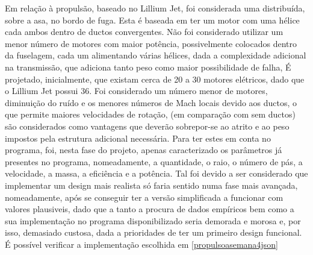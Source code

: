 Em relação à propulsão, baseado no Lillium Jet, foi considerada uma distribuída, sobre a asa, no bordo de fuga. Esta é baseada em ter um motor com uma hélice cada ambos dentro de ductos convergentes. Não foi considerado utilizar um menor número de motores com maior potência, possivelmente colocados dentro da fuselagem, cada um alimentando várias hélices, dada a complexidade adicional na transmissão, que adiciona tanto peso como maior possibilidade de falha, É projetado, inicialmente, que existam cerca de 20 a 30 motores elétricos, dado que o Lillium Jet possui 36\cite{noauthor_2021-sz}. Foi considerado um número menor de motores, diminuição do ruído e os menores números de Mach locais devido aos ductos, o que permite maiores velocidades de rotação, (em comparação com sem ductos) são considerados como vantagens que deverão sobrepor-se ao atrito e ao peso impostos pela estrutura adicional necessária. Para ter estes em conta no programa, foi, nesta fase do projeto, apenas caracterizado os parâmetros já presentes no programa, nomeadamente, a quantidade, o raio, o número de pás, a velocidade, a massa, a eficiência e a potência. Tal foi devido a ser considerado que implementar um design mais realista só faria sentido numa fase mais avançada, nomeadamente, após se conseguir ter a versão simplificada a funcionar com valores plausiveis, dado que a tanto a procura de dados empíricos bem como a sua implementação no programa disponibilizado seria demorada e morosa e, por isso, demasiado custosa, dada a prioridades de ter um primeiro design funcional. É possível verificar a implementação escolhida em \ref{propulsoasemana4json}
\FloatBarrier
